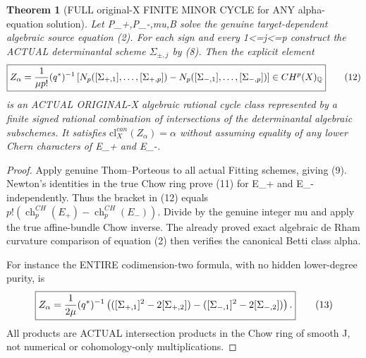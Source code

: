 \documentclass[11pt]{article}
\newtheorem{theorem}{Theorem}[section]
\begin{document}
\begin{theorem}[FULL original-X FINITE MINOR CYCLE for ANY alpha-equation solution]
Let P_+,P_-,mu,B solve the genuine
target-dependent algebraic source equation (2).
For each sign and every 1<=j<=p
construct the ACTUAL determinantal
scheme $\Sigma_{\pm,j}$ by (8).
Then the explicit element
\[
 \boxed{
 Z_\alpha={1\over\mu p!}(q^*)^{-1}
 \left[
 N_p([\Sigma_{+,1}],\ldots,[\Sigma_{+,p}])
 -N_p([\Sigma_{-,1}],\ldots,[\Sigma_{-,p}])
 \right]
 \in CH^p(X)_\mathbb Q
 }                                                       \tag{12}
\]
is an ACTUAL ORIGINAL-X algebraic rational
cycle class represented by a finite
signed rational combination of intersections
of the determinantal algebraic subschemes.
It satisfies
$\mathrm{cl}^{can}_X(Z_\alpha)=\alpha$
without assuming equality of any lower
Chern characters of E_+ and E_-.
\end{theorem}
\begin{proof}
Apply genuine Thom--Porteous to all
actual Fitting schemes, giving (9).
Newton's identities in the true Chow
ring prove (11) for E_+ and E_-
independently. Thus the bracket in
(12) equals
$p!(\operatorname{ch}^{CH}_p(E_+)
-\operatorname{ch}^{CH}_p(E_-))$.
Divide by the genuine integer mu and
apply the true affine-bundle Chow
inverse. The already proved exact
algebraic de Rham curvature comparison
of equation (2) then verifies the
canonical Betti class alpha.

For instance the ENTIRE codimension-two
formula, with no hidden lower-degree
purity, is
\[
 \boxed{
 Z_\alpha={1\over2\mu}(q^*)^{-1}
 \left(
 ([\Sigma_{+,1}]^2-2[\Sigma_{+,2}])
 -
 ([\Sigma_{-,1}]^2-2[\Sigma_{-,2}])
 \right).
 }                                                       \tag{13}
\]
All products are ACTUAL intersection
products in the Chow ring of smooth J,
not numerical or cohomology-only
multiplications.
\end{proof}
\end{document}

